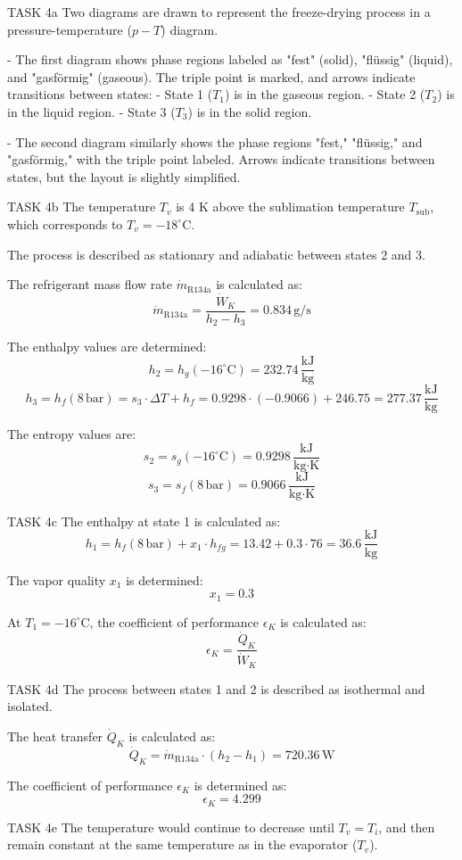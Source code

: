 TASK 4a  
Two diagrams are drawn to represent the freeze-drying process in a pressure-temperature (\( p-T \)) diagram.  

- The first diagram shows phase regions labeled as "fest" (solid), "flüssig" (liquid), and "gasförmig" (gaseous). The triple point is marked, and arrows indicate transitions between states:  
  - State 1 (\( T_1 \)) is in the gaseous region.  
  - State 2 (\( T_2 \)) is in the liquid region.  
  - State 3 (\( T_3 \)) is in the solid region.  

- The second diagram similarly shows the phase regions "fest," "flüssig," and "gasförmig," with the triple point labeled. Arrows indicate transitions between states, but the layout is slightly simplified.  

TASK 4b  
The temperature \( T_v \) is 4 K above the sublimation temperature \( T_{\text{sub}} \), which corresponds to \( T_v = -18^\circ \text{C} \).  

The process is described as stationary and adiabatic between states 2 and 3.  

The refrigerant mass flow rate \( \dot{m}_{\text{R134a}} \) is calculated as:  
\[
\dot{m}_{\text{R134a}} = \frac{\dot{W}_K}{h_2 - h_3} = 0.834 \, \text{g/s}
\]  

The enthalpy values are determined:  
\[
h_2 = h_g(-16^\circ \text{C}) = 232.74 \, \frac{\text{kJ}}{\text{kg}}
\]  
\[
h_3 = h_f(8 \, \text{bar}) = s_3 \cdot \Delta T + h_f = 0.9298 \cdot (-0.9066) + 246.75 = 277.37 \, \frac{\text{kJ}}{\text{kg}}
\]  

The entropy values are:  
\[
s_2 = s_g(-16^\circ \text{C}) = 0.9298 \, \frac{\text{kJ}}{\text{kg·K}}
\]  
\[
s_3 = s_f(8 \, \text{bar}) = 0.9066 \, \frac{\text{kJ}}{\text{kg·K}}
\]  

TASK 4c  
The enthalpy at state 1 is calculated as:  
\[
h_1 = h_f(8 \, \text{bar}) + x_1 \cdot h_{fg} = 13.42 + 0.3 \cdot 76 = 36.6 \, \frac{\text{kJ}}{\text{kg}}
\]  

The vapor quality \( x_1 \) is determined:  
\[
x_1 = 0.3
\]  

At \( T_1 = -16^\circ \text{C} \), the coefficient of performance \( \epsilon_K \) is calculated as:  
\[
\epsilon_K = \frac{\dot{Q}_K}{\dot{W}_K}
\]  

TASK 4d  
The process between states 1 and 2 is described as isothermal and isolated.  

The heat transfer \( \dot{Q}_K \) is calculated as:  
\[
\dot{Q}_K = \dot{m}_{\text{R134a}} \cdot (h_2 - h_1) = 720.36 \, \text{W}
\]  

The coefficient of performance \( \epsilon_K \) is determined as:  
\[
\epsilon_K = 4.299
\]  

TASK 4e  
The temperature would continue to decrease until \( T_v = T_i \), and then remain constant at the same temperature as in the evaporator (\( T_v \)).